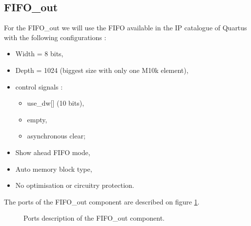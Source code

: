 \documentclass[11pt]{article}
\begin{document}
\subsection{FIFO\_out}
For the FIFO\_out we will use the FIFO available in the IP catalogue of Quartus with the following configurations :
\begin{itemize}
    \item Width = 8 bits,
    \item Depth = 1024 (biggest size with only one M10k element),
    \item control signals : \begin{itemize}
        \item use\_dw[] (10 bits),
        \item empty,
        \item asynchronous clear; \end{itemize}
    \item Show ahead FIFO mode,
    \item Auto memory block type,
    \item No optimisation or circuitry protection.
\end{itemize}

The ports of the FIFO\_out component are described on figure \ref{fifo_out_ports}.
\begin{figure}[H]
        \caption{Ports description of the FIFO\_out component.}
        \label{fifo_out_ports}
\end{figure}
\pagebreak
\end{document}
